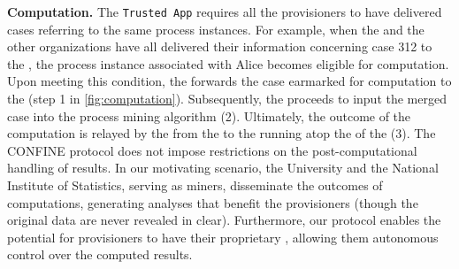 \noindent\textbf{Computation.} The \texttt{Trusted App} requires all the provisioners to have delivered cases referring to the same process instances. For example, when the  and the other organizations have all delivered their information concerning case 312 to the , the process instance associated with Alice becomes eligible for computation. Upon meeting this condition, the  forwards the case earmarked for computation to the  (step 1 in \cref{fig:computation}). Subsequently, the  proceeds to input the merged case into the process mining algorithm (2). Ultimately, the outcome of the computation is relayed by the  from the  to the  running atop the  of the  (3). The CONFINE protocol does not impose restrictions on the post-computational handling of results. In our motivating scenario, the University and the National Institute of Statistics, serving as miners, disseminate the outcomes of computations, generating analyses that benefit the provisioners (though the original data are never revealed in clear). Furthermore, our protocol enables the potential for provisioners to have their proprietary , allowing them autonomous control over the computed results.

